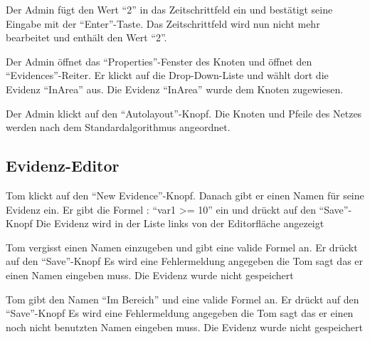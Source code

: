 \documentclass[parskip=full,11pt,twoside]{scrartcl}
\begin{document}
{Der Admin fügt den Wert \enquote{2} in das Zeitschrittfeld ein und bestätigt seine Eingabe mit der \enquote{Enter}-Taste.}
{Das Zeitschrittfeld wird nun nicht mehr bearbeitet und enthält den Wert \enquote{2}.}


{Der Admin öffnet das \enquote{Properties}-Fenster des Knoten und öffnet den \enquote{Evidences}-Reiter. Er klickt auf die Drop-Down-Liste und wählt dort die Evidenz \enquote{InArea} aus.}
{Die Evidenz \enquote{InArea} wurde dem Knoten zugewiesen.}


{Der Admin klickt auf den \enquote{Autolayout}-Knopf.}
{Die Knoten und Pfeile des Netzes werden nach dem Standardalgorithmus angeordnet.}

\subsection{Evidenz-Editor}


{Tom klickt auf den \enquote{New Evidence}-Knopf. Danach gibt er einen Namen für seine Evidenz ein. Er gibt die Formel : 
\enquote{var1 >= 10} ein und drückt auf den \enquote{Save}-Knopf}
{Die Evidenz wird in der Liste links von der Editorfläche angezeigt}

{Tom vergisst einen Namen einzugeben und gibt eine valide Formel an. Er drückt auf den \enquote{Save}-Knopf}
{Es wird eine Fehlermeldung angegeben die Tom sagt das er einen Namen eingeben muss. Die Evidenz wurde nicht gespeichert}

{Tom gibt den Namen \enquote{Im Bereich} und eine valide Formel an. Er drückt auf den \enquote{Save}-Knopf}
{Es wird eine Fehlermeldung angegeben die Tom sagt das er einen noch nicht benutzten Namen eingeben muss. Die Evidenz wurde nicht gespeichert}
\end{document}
